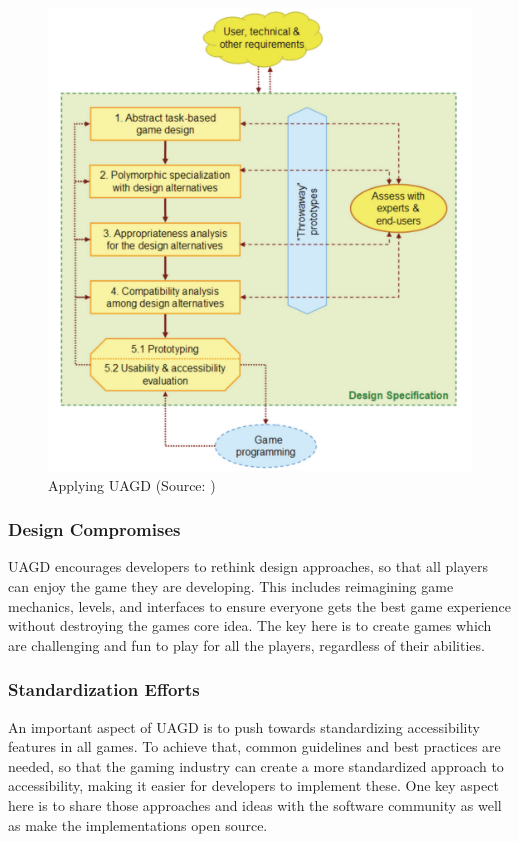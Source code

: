 \documentclass[sigconf,natbib=false,10pt]{acmart}
\begin{document}
	\begin{figure}[ht]
		\centering
		\includegraphics[scale=0.5]{assets/universal-game-design-approach.png}
		\caption{Applying UAGD (Source: \textcite{grammenos_unified_2007})}
		\label{fig:universal-game-design-approach}
	\end{figure}
	
	\subsubsection{Design Compromises}
	UAGD encourages developers to rethink design approaches, so that all players can enjoy the game they are developing.
	This includes reimagining game mechanics, levels, and interfaces to ensure everyone gets the best game experience without destroying the games core idea.
	The key here is to create games which are challenging and fun to play for all the players, regardless of their abilities.
	
	\subsubsection{Standardization Efforts}
	An important aspect of UAGD is to push towards standardizing accessibility features in all games.
	To achieve that, common guidelines and best practices are needed, so that the gaming industry can create a more standardized approach to accessibility, making it easier for developers to implement these.
	One key aspect here is to share those approaches and ideas with the software community as well as make the implementations open source.
	
\end{document}
